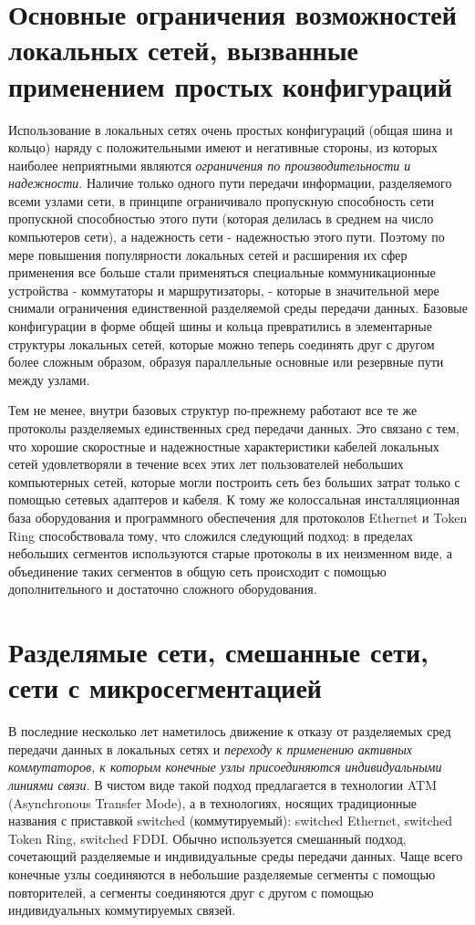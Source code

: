 \section{Основные ограничения возможностей локальных сетей, вызванные применением простых конфигураций}

Использование в локальных сетях очень простых конфигураций (общая шина и кольцо) наряду с положительными имеют и негативные стороны, из которых наиболее неприятными являются \emph{ограничения по производительности и надежности}.
Наличие только одного пути передачи информации, разделяемого всеми узлами сети, в принципе ограничивало пропускную способность сети пропускной способностью этого пути (которая делилась в среднем на число компьютеров сети), а надежность сети - надежностью этого пути.
Поэтому по мере повышения популярности локальных сетей и расширения их сфер применения все больше стали применяться специальные коммуникационные устройства - коммутаторы и маршрутизаторы, - которые в значительной мере снимали ограничения единственной разделяемой среды передачи данных.
Базовые конфигурации в форме общей шины и кольца превратились в элементарные структуры локальных сетей, которые можно теперь соединять друг с другом более сложным образом, образуя параллельные основные или резервные пути между узлами.

Тем не менее, внутри базовых структур по-прежнему работают все те же протоколы разделяемых единственных сред передачи данных.
Это связано с тем, что хорошие скоростные и надежностные характеристики кабелей локальных сетей удовлетворяли в течение всех этих лет пользователей небольших компьютерных сетей, которые могли построить сеть без больших затрат только с помощью сетевых адаптеров и кабеля.
К тому же колоссальная инсталляционная база оборудования и программного обеспечения для протоколов Ethernet и Token Ring способствовала тому, что сложился следующий подход: в пределах небольших сегментов используются старые протоколы в их неизменном виде, а объединение таких сегментов в общую сеть происходит с помощью дополнительного и достаточно сложного оборудования.

\section{Разделямые сети, смешанные сети, сети с микросегментацией}

В последние несколько лет наметилось движение к отказу от разделяемых сред передачи данных в локальных сетях и \emph{переходу к применению активных коммутаторов, к которым конечные узлы присоединяются индивидуальными линиями связи}.
В чистом виде такой подход предлагается в технологии ATM (Asynchronous Transfer Mode), а в технологиях, носящих традиционные названия с приставкой switched (коммутируемый): switched Ethernet, switched Token Ring, switched FDDI. Обычно используется  смешанный подход, сочетающий разделяемые и индивидуальные среды передачи данных.
Чаще всего конечные узлы соединяются в небольшие разделяемые сегменты с помощью повторителей, а сегменты соединяются друг с другом с помощью индивидуальных коммутируемых связей.

